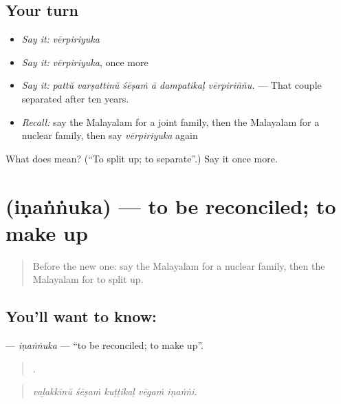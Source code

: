 \subsection*{Your turn}
\begin{itemize}
\raggedright
  \item \emph{Say it:} \emph{vērpiriyuka}
  \item \emph{Say it:} \emph{vērpiriyuka}, once more
  \item \emph{Say it:} \emph{pattŭ varṣattinŭ śēṣaṁ ā dampatikaḷ vērpiriññu.} — That couple separated after ten years.
  \item \emph{Recall:} say the Malayalam for a joint family, then the Malayalam for a nuclear family, then say \emph{vērpiriyuka} again
\end{itemize}

\begin{tcolorbox}[breakable,colback=teal!4,colframe=teal!35!black,title={Before you move on}]
What does  mean? (\textquotedblleft{}To split up; to separate\textquotedblright{}.) Say it once more.
\end{tcolorbox}
\section[\texorpdfstring{\ml{ഇണങ്ങുക} (iṇaṅṅuka)}{ഇണങ്ങുക (iṇaṅṅuka)}]{ (iṇaṅṅuka) — to be reconciled; to make up}

\label{lesson:ML-C555-inannuka}



\begin{quote}
Before the new one: say the Malayalam for a nuclear family, then the Malayalam for to split up.
\end{quote}

\subsection*{You'll want to know: }
\textbf{} — \emph{iṇaṅṅuka} — \textquotedblleft{}to be reconciled; to make up\textquotedblright{}.

\begin{quote}
    .
\end{quote}

\begin{quote}
\emph{vaḻakkinŭ śēṣaṁ kuṭṭikaḷ vēgaṁ iṇaṅṅi.}
\end{quote}

